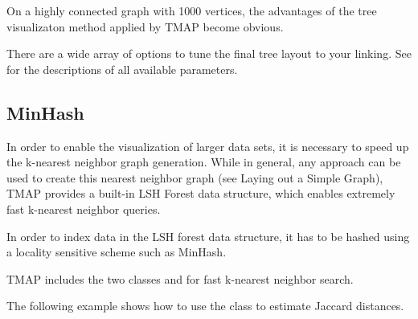 \documentclass[letterpaper,10pt,english]{sphinxmanual}
\begin{document}
\noindent{}

On a highly connected graph with 1000 vertices, the advantages
of the tree visualizaton method applied by TMAP become obvious.

\noindent{}

There are a wide array of options to tune the final tree layout
to your linking. See {\hyperref[\detokenize{documentation:layout-doc}]{}} for the descriptions of all
available parameters.


\subsection{MinHash}
\label{\detokenize{tutorial:minhash}}
In order to enable the visualization of larger data sets, it is
necessary to speed up the k-nearest neighbor graph generation. While
in general, any approach can be used to create this nearest neighbor
graph (see Laying out a Simple Graph), TMAP provides a built-in LSH Forest
data structure, which enables extremely fast k-nearest neighbor queries.

In order to index data in the LSH forest data structure, it has to be
hashed using a locality sensitive scheme such as MinHash.

TMAP includes the two classes  and  for
fast k-nearest neighbor search.

The following example shows how to use the  class to estimate
Jaccard distances.
\end{document}

